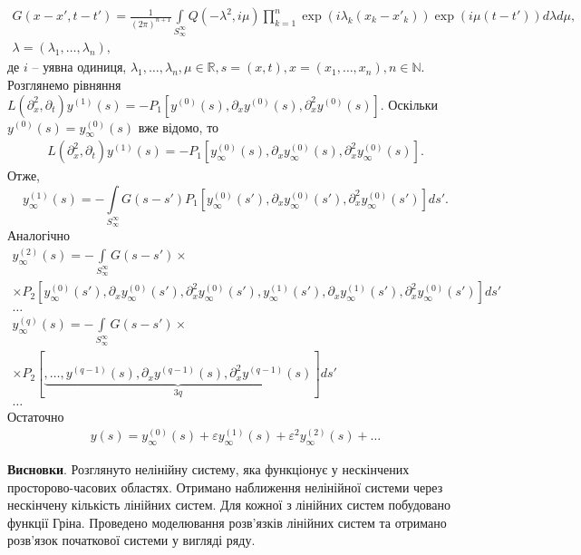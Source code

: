 \begin{gather*}
    G(x-x', t-t') = \frac{1}{(2\pi)^{n+1}}\int\limits_{S_\infty^\infty}Q(-\lambda^2, i\mu)\prod_{k=1}^n\exp
    (i\lambda_k(x_k - x'_k))\exp(i\mu(t-t'))d\lambda d\mu,\\
    \lambda=(\lambda_{1},\dots,\lambda_{n}),
\end{gather*}
де $i$ -- уявна одиниця, $\lambda_{1},\dots,\lambda_{n},\mu\in\mathbb{R},s=(x,t),x=(x_{1},\dots,x_{n}), n\in\mathbb{N}$.
Розглянемо рівняння $L(\partial_x^2, \partial_t)y^{(1)}(s)=-P_{1}
\left[
y^{(0)}(s), \partial_x y^{(0)}(s), \partial_x^2 y^{(0)}(s)
\right]$.
Оскільки $y^{(0)}(s)=y^{(0)}_{\infty}(s)$ вже відомо, то
\begin{gather*}
    L(\partial_x^2, \partial_t)y^{(1)}(s)=-P_{1}
    \left[
    y_{\infty}^{(0)}(s), \partial_x y_{\infty}^{(0)}(s), \partial_x^2 y_{\infty}^{(0)}(s)
    \right].
\end{gather*}
Отже,
\[
    y_{\infty}^{(1)}(s) = -\int\limits_{S_\infty^\infty}G(s-s')P_{1}
    \left[
    y_{\infty}^{(0)}(s'), \partial_x y_{\infty}^{(0)}(s'), \partial_x^2 y_{\infty}^{(0)}(s')
    \right]ds'.
\]
Аналогічно
\begin{gather*}
    y_{\infty}^{(2)}(s) = -\int\limits_{S_\infty^\infty}G(s-s')\times\\
    \times P_{2}
    \left[
    y_{\infty}^{(0)}(s'), \partial_x y_{\infty}^{(0)}(s'), \partial_x^2 y_{\infty}^{(0)}(s'),
    y_{\infty}^{(1)}(s'), \partial_x y_{\infty}^{(1)}(s'), \partial_x^2 y_{\infty}^{(0)}(s')
    \right]ds'\\
    \dots\\
    y_{\infty}^{(q)}(s)=-\int\limits_{S_\infty^\infty}G(s-s')\times\\
    \times P_{2}
    \left[
        \underbrace{
            ,\dots,
            y^{(q-1)}(s), \partial_x y^{(q-1)}(s), \partial_x^2 y^{(q-1)}(s)
        }_{3q}
    \right]ds'\\
    \dots
\end{gather*}
Остаточно
\begin{gather*}
    y(s)=y_{\infty}^{(0)}(s) + \varepsilon y_{\infty}^{(1)}(s) + \varepsilon^2 y_{\infty}^{(2)}(s) + \dots
\end{gather*}

\textbf{Висновки}.
Розглянуто нелінійну систему, яка функціонує у нескінчених просторово-часових областях.
Отримано наближення нелінійної системи через нескінчену кількість лінійних систем.
Для кожної з лінійних систем побудовано функції Гріна.
Проведено моделювання розв'язків лінійних систем та отримано розв'язок початкової системи у вигляді ряду.


